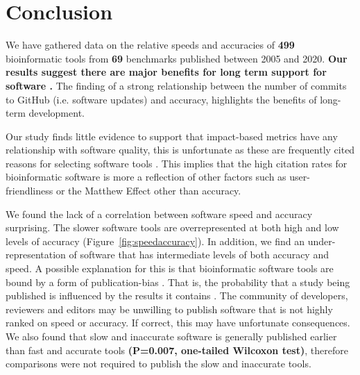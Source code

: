 \documentclass[fleqn,10pt]{SelfArx} %
\def\numTools{499}
\def\numBenchmarkPubs{69}
\begin{document}
\section*{Conclusion}

We have gathered data on the relative speeds and accuracies of
\textbf{{\color{red}\numTools~}} bioinformatic tools from
\textbf{{\color{red}\numBenchmarkPubs}} benchmarks published between
2005 and 2020. {\bf Our results suggest there are major benefits for
  long term support for software \cite{siepel2019challenges}.} The
finding of a strong relationship between the number of commits to
GitHub (i.e. software updates) and accuracy, highlights the benefits of
long-term development.

Our study finds little evidence to support that impact-based metrics
have any relationship with software quality, this is unfortunate as these
are frequently cited reasons for selecting software tools
\cite{Loman2015-bw}. This implies that the high citation
rates for bioinformatic software
\cite{Perez-Iratxeta2007-lv,Van_Noorden2014-kc,Wren2016-xy} is more a
reflection of other factors such as user-friendliness or the Matthew Effect
\cite{Lariviere2010-kx,Merton1968-cb} other than accuracy.

We found the lack of a correlation between software speed and accuracy
surprising.  The slower software tools are overrepresented at both
high and low levels of accuracy (Figure~\ref{fig:speedaccuracy}).
In addition, we find an under-representation of software that has
intermediate levels of both accuracy and speed. A possible explanation
for this is that bioinformatic software tools are bound by a form of
publication-bias \cite{Boulesteix2015-am,Nissen:2016}. That is, the
probability that a study being published is influenced by the results
it contains \cite{sterling1995publication}. The community of
developers, reviewers and editors may be unwilling to publish software
that is not highly ranked on speed or accuracy. If correct, this may
have unfortunate consequences.  We also found that slow and inaccurate
software is generally published earlier than fast and accurate tools
\textbf{{\color{red}(P=0.007, one-tailed Wilcoxon test)}}, therefore
comparisons were not required to publish the slow and
inaccurate tools.

\end{document}
